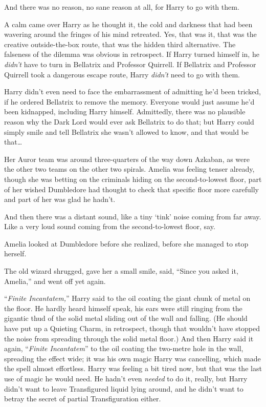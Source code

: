 And there was no reason, no sane reason at all, for Harry to go with them.

A calm came over Harry as he thought it, the cold and darkness that had been wavering around the fringes of his mind retreated. Yes, that was it, that was the creative outside-the-box route, that was the hidden third alternative. The falseness of the dilemma was obvious in retrospect. If Harry turned himself in, he \emph{didn’t} have to turn in Bellatrix and Professor Quirrell. If Bellatrix and Professor Quirrell took a dangerous escape route, Harry \emph{didn’t} need to go with them.

Harry didn’t even need to face the embarrassment of admitting he’d been tricked, if he ordered Bellatrix to remove the memory. Everyone would just assume he’d been kidnapped, including Harry himself. Admittedly, there was no plausible reason why the Dark Lord would ever ask Bellatrix to do that; but Harry could simply smile and tell Bellatrix she wasn’t allowed to know, and that would be that…

\later

Her Auror team was around three-quarters of the way down Azkaban, as were the other two teams on the other two spirals. Amelia was feeling tenser already, though she was betting on the criminals hiding on the second-to-lowest floor, part of her wished Dumbledore had thought to check that specific floor more carefully and part of her was glad he hadn’t.

And then there was a distant sound, like a tiny ‘tink’ noise coming from far away. Like a very loud sound coming from the second-to-lowest floor, say.

Amelia looked at Dumbledore before she realized, before she managed to stop herself.

The old wizard shrugged, gave her a small smile, said, “Since you asked it, Amelia,” and went off yet again.

\later

“\emph{Finite Incantatem,}” Harry said to the oil coating the giant chunk of metal on the floor. He hardly heard himself speak, his ears were still ringing from the gigantic thud of the solid metal sliding out of the wall and falling. (He should have put up a Quieting Charm, in retrospect, though that wouldn’t have stopped the noise from spreading through the solid metal floor.) And then Harry said it again, “\emph{Finite Incantatem}” to the oil coating the two-metre hole in the wall, spreading the effect wide; it was his own magic Harry was cancelling, which made the spell almost effortless. Harry was feeling a bit tired now, but that was the last use of magic he would need. He hadn’t even \emph{needed} to do it, really, but Harry didn’t want to leave Transfigured liquid lying around, and he didn’t want to betray the secret of partial Transfiguration either.

